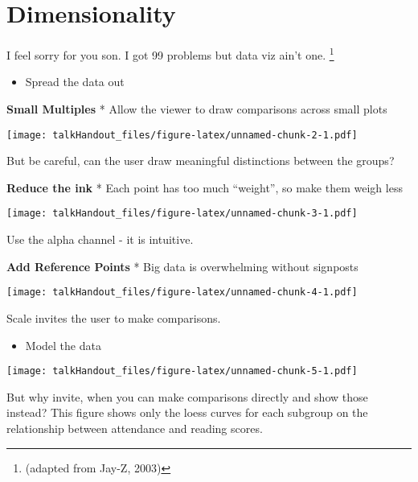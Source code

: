 \documentclass{tufte-handout}
\begin{document}
\section{Dimensionality}\label{dimensionality}

 I feel sorry for you son. I got 99
problems but data viz ain't one. \footnote{(adapted from Jay-Z, 2003)}

\begin{itemize}
\itemsep1pt\parskip0pt
\item
  Spread the data out
\end{itemize}

\textbf{Small Multiples} * Allow the viewer to draw comparisons across
small plots

\begin{marginfigure}
 \texttt{[image: talkHandout\_files/figure-latex/unnamed-chunk-2-1.pdf]}
\caption{But be careful, can the user draw meaningful distinctions between the groups?}
\end{marginfigure}

\textbf{Reduce the ink} * Each point has too much ``weight'', so make
them weigh less

\begin{marginfigure}
 \texttt{[image: talkHandout\_files/figure-latex/unnamed-chunk-3-1.pdf]}
\caption{Use the alpha channel - it is intuitive.}
\end{marginfigure}

\textbf{Add Reference Points} * Big data is overwhelming without
signposts

\begin{marginfigure}
 \texttt{[image: talkHandout\_files/figure-latex/unnamed-chunk-4-1.pdf]}
\caption{Scale invites the user to make comparisons.}
\end{marginfigure}

\begin{itemize}
\itemsep1pt\parskip0pt
\item
  Model the data
\end{itemize}

\begin{marginfigure}
 \texttt{[image: talkHandout\_files/figure-latex/unnamed-chunk-5-1.pdf]}
\caption{But why invite, when you can make comparisons directly and show those instead? This figure shows only the loess curves for each subgroup on the relationship between attendance and reading scores.}
\end{marginfigure}
\end{document}

